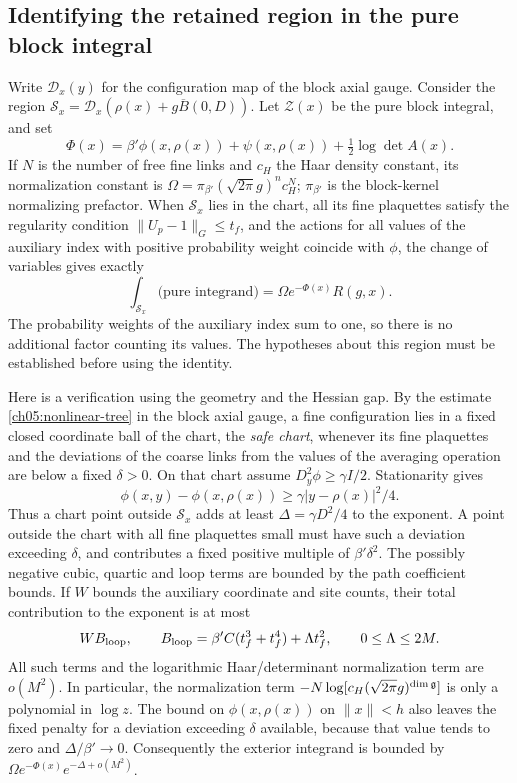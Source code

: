 \subsection{Identifying the retained region in the pure block integral}
\label{ch09:stationary-exterior}

Write $\mathcal D_x(y)$ for the configuration map of the block axial gauge.
Consider the region
$\mathcal S_x=\mathcal D_x(\rho(x)+g\overline B(0,D))$.
Let $\mathscr Z(x)$ be the pure block integral, and set
\[
 \Phi(x)=\beta'\phi(x,\rho(x))+\psi(x,\rho(x))
                         +\tfrac12\log\det A(x).
\]
If $N$ is the number of free fine links and $c_H$ the Haar density
constant, its normalization constant is
$\Omega=\pi_{\beta'}(\sqrt{2\pi}g)^n c_H^N$;
$\pi_{\beta'}$ is the block-kernel normalizing prefactor.
When $\mathcal S_x$ lies in the chart, all its fine plaquettes satisfy
the regularity condition $\|U_p-1\|_G\le t_f$, and the actions for all values of the auxiliary index with positive probability weight coincide with $\phi$, the
change of variables gives exactly
\begin{equation}
 \int_{\mathcal S_x}\text{(pure integrand)}
                  =\Omega e^{-\Phi(x)}R(g,x).
 \label{ch09:retained-identity}
\end{equation}
The probability weights of the auxiliary index sum to one, so there is no additional factor counting its values.
The hypotheses about this region must be established before
using the identity.

Here is a verification using the geometry and the Hessian gap.
By the estimate \eqref{ch05:nonlinear-tree} in the block axial gauge, a fine
configuration lies in a fixed closed coordinate ball of the chart, the \emph{safe chart}, whenever its fine
plaquettes and the deviations of the coarse links from the values of the averaging operation are below a fixed $\delta>0$.
On that chart assume $D_y^2\phi\ge\gamma I/2$. Stationarity gives
\[
 \phi(x,y)-\phi(x,\rho(x))
                      \ge\gamma|y-\rho(x)|^2/4.
\]
Thus a chart point outside $\mathcal S_x$ adds at least
$\Delta=\gamma D^2/4$ to the exponent. A point outside the chart
with all fine plaquettes small must have such a deviation exceeding
$\delta$, and contributes a fixed positive multiple of $\beta'\delta^2$.
The possibly negative cubic, quartic and loop terms are bounded by
the path coefficient bounds. If $W$ bounds the auxiliary coordinate and site
counts, their total contribution to the exponent is at most
\[
 W B_{\rm loop},\qquad
 B_{\rm loop}=\beta'C(t_f^3+t_f^4)+\Lambda t_f^2,
 \qquad 0\le\Lambda\le2M.
\]
All such terms and the logarithmic Haar/determinant normalization
term are $o(M^2)$. In particular, the normalization term
$-N\log[c_H(\sqrt{2\pi}g)^{\dim\mathfrak g}]$ is only a polynomial
in $\log z$. The bound on $\phi(x,\rho(x))$ on $\|x\|<h$
also leaves the fixed penalty for a deviation exceeding $\delta$ available, because
that value tends to zero and $\Delta/\beta'\to0$.
Consequently the exterior integrand is bounded by
$\Omega e^{-\Phi(x)}e^{-\Delta+o(M^2)}$.


